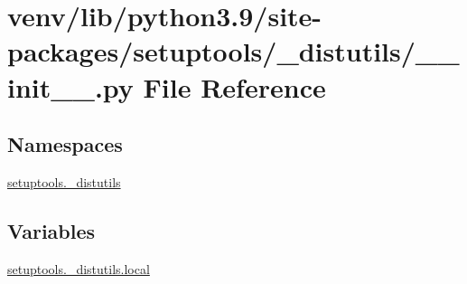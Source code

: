\hypertarget{venv_2lib_2python3_89_2site-packages_2setuptools_2__distutils_2____init_____8py}{}\section{venv/lib/python3.9/site-\/packages/setuptools/\+\_\+distutils/\+\_\+\+\_\+init\+\_\+\+\_\+.py File Reference}
\label{venv_2lib_2python3_89_2site-packages_2setuptools_2__distutils_2____init_____8py}
\subsection*{Namespaces}
\begin{DoxyCompactItemize}
\item 
 \hyperlink{namespacesetuptools_1_1__distutils}{setuptools.\+\_\+distutils}
\end{DoxyCompactItemize}
\subsection*{Variables}
\begin{DoxyCompactItemize}
\item 
\hyperlink{namespacesetuptools_1_1__distutils_a2ab0d52b8e2fe00e3f0c4090963bdd30}{setuptools.\+\_\+distutils.\+local}
\end{DoxyCompactItemize}

